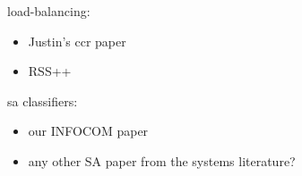 load-balancing:
\begin{itemize}
\item Justin's ccr paper
\item RSS++
\end{itemize}

sa classifiers:
\begin{itemize}
\item our INFOCOM paper
\item any other SA paper from the systems literature?
\end{itemize}


